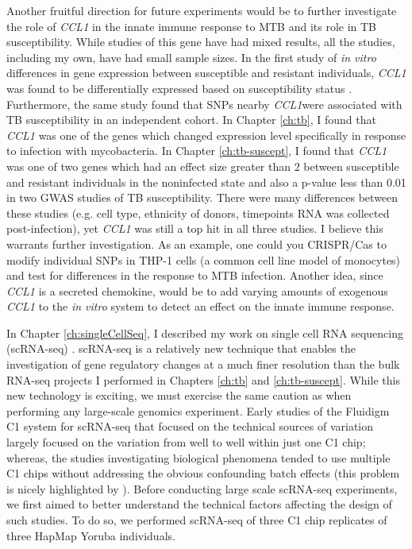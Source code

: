 Another fruitful direction for future experiments would be to further
investigate the role of \emph{CCL1} in the innate immune response to
MTB and its role in TB susceptibility. While studies of this gene have
had mixed results, all the studies, including my own, have had small
sample sizes. In the first study of \emph{in vitro} differences in
gene expression between susceptible and resistant individuals,
\emph{CCL1} was found to be differentially expressed based on
susceptibility status \citep{Thuong2008}. Furthermore, the same study
found that SNPs nearby \emph{CCL1}were associated with TB
susceptibility in an independent cohort. In Chapter \ref{ch:tb}, I
found that \emph{CCL1} was one of the genes which changed expression
level specifically in response to infection with mycobacteria. In
Chapter \ref{ch:tb-suscept}, I found that \emph{CCL1} was one of two
genes which had an effect size greater than 2 between susceptible and
resistant individuals in the noninfected state and also a p-value less
than 0.01 in two GWAS studies of TB susceptibility. There were many
differences between these studies (e.g. cell type, ethnicity of
donors, timepoints RNA was collected post-infection), yet \emph{CCL1}
was still a top hit in all three studies. I believe this warrants
further investigation. As an example, one could you CRISPR/Cas to
modify individual SNPs in THP-1 cells (a common cell line model of
monocytes) and test for differences in the response to MTB
infection. Another idea, since \emph{CCL1} is a secreted chemokine,
would be to add varying amounts of exogenous \emph{CCL1} to the
\emph{in vitro} system to detect an effect on the innate immune
response.

In Chapter \ref{ch:singleCellSeq}, I described my work on single cell
RNA sequencing (scRNA-seq) \citep{Tung2016}. scRNA-seq is a relatively
new technique that enables the investigation of gene regulatory
changes at a much finer resolution than the bulk RNA-seq projects I
performed in Chapters \ref{ch:tb} and \ref{ch:tb-suscept}. While this
new technology is exciting, we must exercise the same caution as when
performing any large-scale genomics experiment. Early studies of the
Fluidigm C1 system for scRNA-seq that focused on the technical sources
of variation largely focused on the variation from well to well within
just one C1 chip; whereas, the studies investigating biological
phenomena tended to use multiple C1 chips without addressing the
obvious confounding batch effects (this problem is nicely highlighted
by \citep{Hicks2015}). Before conducting large scale scRNA-seq
experiments, we first aimed to better understand the technical factors
affecting the design of such studies. To do so, we performed scRNA-seq
of three C1 chip replicates of three HapMap Yoruba individuals.

